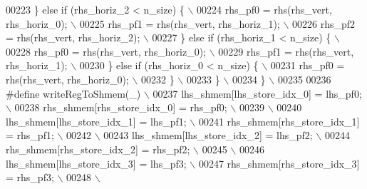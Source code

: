 \begin{DoxyCode}
00223 \textcolor{preprocessor}{      \} else if (rhs\_horiz\_2 < n\_size) \{                        \(\backslash\)}
00224 \textcolor{preprocessor}{        rhs\_pf0 = rhs(rhs\_vert, rhs\_horiz\_0);                   \(\backslash\)}
00225 \textcolor{preprocessor}{        rhs\_pf1 = rhs(rhs\_vert, rhs\_horiz\_1);                   \(\backslash\)}
00226 \textcolor{preprocessor}{        rhs\_pf2 = rhs(rhs\_vert, rhs\_horiz\_2);                   \(\backslash\)}
00227 \textcolor{preprocessor}{      \} else if (rhs\_horiz\_1 < n\_size) \{                        \(\backslash\)}
00228 \textcolor{preprocessor}{        rhs\_pf0 = rhs(rhs\_vert, rhs\_horiz\_0);                   \(\backslash\)}
00229 \textcolor{preprocessor}{        rhs\_pf1 = rhs(rhs\_vert, rhs\_horiz\_1);                   \(\backslash\)}
00230 \textcolor{preprocessor}{      \} else if (rhs\_horiz\_0 < n\_size) \{                        \(\backslash\)}
00231 \textcolor{preprocessor}{        rhs\_pf0 = rhs(rhs\_vert, rhs\_horiz\_0);                   \(\backslash\)}
00232 \textcolor{preprocessor}{      \}                                                         \(\backslash\)}
00233 \textcolor{preprocessor}{    \}                                                           \(\backslash\)}
00234 \textcolor{preprocessor}{  \}                                                             \(\backslash\)}
00235 \textcolor{preprocessor}{}
00236 \textcolor{preprocessor}{#define writeRegToShmem(\_)                      \(\backslash\)}
00237 \textcolor{preprocessor}{  lhs\_shmem[lhs\_store\_idx\_0] = lhs\_pf0;         \(\backslash\)}
00238 \textcolor{preprocessor}{  rhs\_shmem[rhs\_store\_idx\_0] = rhs\_pf0;         \(\backslash\)}
00239 \textcolor{preprocessor}{                                                \(\backslash\)}
00240 \textcolor{preprocessor}{  lhs\_shmem[lhs\_store\_idx\_1] = lhs\_pf1;         \(\backslash\)}
00241 \textcolor{preprocessor}{  rhs\_shmem[rhs\_store\_idx\_1] = rhs\_pf1;         \(\backslash\)}
00242 \textcolor{preprocessor}{                                                \(\backslash\)}
00243 \textcolor{preprocessor}{  lhs\_shmem[lhs\_store\_idx\_2] = lhs\_pf2;         \(\backslash\)}
00244 \textcolor{preprocessor}{  rhs\_shmem[rhs\_store\_idx\_2] = rhs\_pf2;         \(\backslash\)}
00245 \textcolor{preprocessor}{                                                \(\backslash\)}
00246 \textcolor{preprocessor}{  lhs\_shmem[lhs\_store\_idx\_3] = lhs\_pf3;         \(\backslash\)}
00247 \textcolor{preprocessor}{  rhs\_shmem[rhs\_store\_idx\_3] = rhs\_pf3;         \(\backslash\)}
00248 \textcolor{preprocessor}{                                                \(\backslash\)}

\end{DoxyCode}
